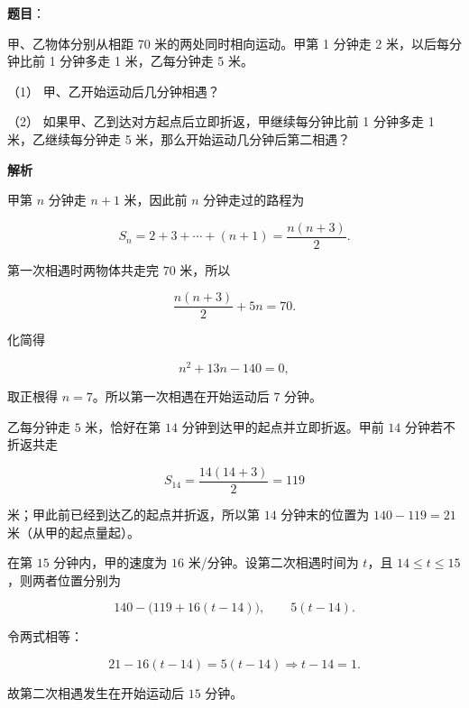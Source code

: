 \begin{answer}

\textbf{题目}：

甲、乙物体分别从相距 70 米的两处同时相向运动。甲第 1 分钟走 2 米，以后每分钟比前 1 分钟多走 1 米，乙每分钟走 5 米。

（1） 甲、乙开始运动后几分钟相遇？

（2） 如果甲、乙到达对方起点后立即折返，甲继续每分钟比前 1 分钟多走 1 米，乙继续每分钟走 5 米，那么开始运动几分钟后第二相遇？

\textbf{解析}

甲第 $n$ 分钟走 $n+1$ 米，因此前 $n$ 分钟走过的路程为

\nopagebreak[4]
\[
S_n=2+3+\cdots+(n+1)=\frac{n(n+3)}2.
\]


第一次相遇时两物体共走完 $70$ 米，所以

\nopagebreak[4]
\[
\frac{n(n+3)}2+5n=70.
\]

化简得

\nopagebreak[4]
\[
n^2+13n-140=0,
\]

取正根得 $n=7$。所以第一次相遇在开始运动后 $7$ 分钟。


乙每分钟走 $5$ 米，恰好在第 $14$ 分钟到达甲的起点并立即折返。甲前 $14$ 分钟若不折返共走

\nopagebreak[4]
\[
S_{14}=\frac{14(14+3)}2=119
\]

米；甲此前已经到达乙的起点并折返，所以第 $14$ 分钟末的位置为 $140-119=21$ 米（从甲的起点量起）。

在第 $15$ 分钟内，甲的速度为 $16$ 米/分钟。设第二次相遇时间为 $t$，且 $14\leqslant t\leqslant15$，则两者位置分别为

\nopagebreak[4]
\[
140-\bigl(119+16(t-14)\bigr),\qquad 5(t-14).
\]

令两式相等：

\nopagebreak[4]
\[
21-16(t-14)=5(t-14)
\Longrightarrow t-14=1.
\]

故第二次相遇发生在开始运动后 $15$ 分钟。



\end{answer}
